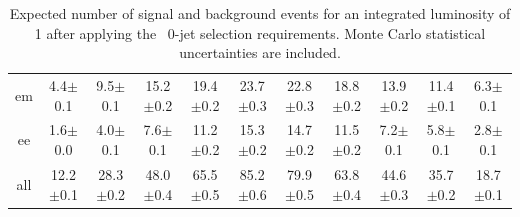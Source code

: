 \begin{table}[!ht]
\begin{center}
{\begin{tabular} {|c|c|c|c|c|c|c|c|c|c|c|}
  em &  4.4$\pm$0.1 &  9.5$\pm$0.1 & 15.2$\pm$0.2 & 19.4$\pm$0.2 & 23.7$\pm$0.3 & 22.8$\pm$0.3 & 18.8$\pm$0.2 & 13.9$\pm$0.2 & 11.4$\pm$0.1 &  6.3$\pm$0.1 \\
  ee &  1.6$\pm$0.0 &  4.0$\pm$0.1 &  7.6$\pm$0.1 & 11.2$\pm$0.2 & 15.3$\pm$0.2 & 14.7$\pm$0.2 & 11.5$\pm$0.2 &  7.2$\pm$0.1 &  5.8$\pm$0.1 &  2.8$\pm$0.1 \\
  \hline
 all & 12.2$\pm$0.1 & 28.3$\pm$0.2 & 48.0$\pm$0.4 & 65.5$\pm$0.5 & 85.2$\pm$0.6 & 79.9$\pm$0.5 & 63.8$\pm$0.4 & 44.6$\pm$0.3 & 35.7$\pm$0.2 & 18.7$\pm$0.1 \\
 \hline
  \end{tabular}
  }
  \caption{Expected number of signal and background events for an 
  integrated luminosity of 1\ifb{} after 
  applying the \ww\ 0-jet selection requirements. Monte Carlo statistical uncertainties are 
  included.}
   \label{tab:wwselection0}
  \end{center}
\end{table}

